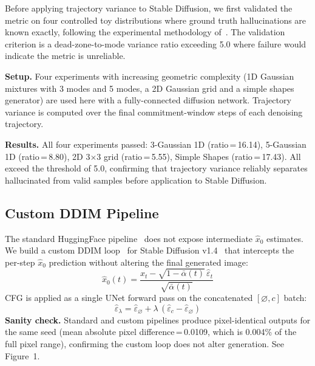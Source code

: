 \documentclass[conference]{IEEEtran}
\begin{document}
Before applying trajectory variance to Stable Diffusion, we first
validated the metric on four controlled toy distributions where
ground truth hallucinations are known exactly, following the
experimental methodology of~\cite{yi2024understanding}. The
validation criterion is a dead-zone-to-mode variance ratio exceeding
5.0 where failure would indicate the metric is unreliable.

\textbf{Setup.} Four experiments with increasing geometric complexity
(1D Gaussian mixtures with 3 modes and 5 modes, a 2D Gaussian grid and a simple shapes
generator) are used here with a fully-connected diffusion network. Trajectory variance
is computed over the final commitment-window steps of each denoising
trajectory.

\textbf{Results.} All four experiments passed: 3-Gaussian 1D
(ratio\,=\,16.14), 5-Gaussian 1D (ratio\,=\,8.80), 2D 3$\times$3
grid (ratio\,=\,5.55), Simple Shapes (ratio\,=\,17.43). All exceed
the threshold of 5.0, confirming that trajectory variance reliably
separates hallucinated from valid samples before application to
Stable Diffusion.

\subsection{Custom DDIM Pipeline}
\label{sec:pipeline}

The standard HuggingFace pipeline~\cite{wolf2020huggingface} does
not expose intermediate $\hat{x}_0$ estimates. We build a custom
DDIM loop~\cite{song2020ddim} for Stable Diffusion
v1.4~\cite{rombach2022ldm} that intercepts the per-step $\hat{x}_0$
prediction without altering the final generated image:
\begin{equation}
  \hat{x}_0(t) = \frac{x_t - \sqrt{1-\bar{\alpha}(t)}\,\hat{\varepsilon}_t}
                      {\sqrt{\bar{\alpha}(t)}}
  \label{eq:x0_pred}
\end{equation}
CFG is applied as a single UNet forward pass on the concatenated
$[\varnothing, c]$ batch:
\begin{equation}
  \hat{\varepsilon}_\lambda = \hat{\varepsilon}_\varnothing
    + \lambda\,(\hat{\varepsilon}_c - \hat{\varepsilon}_\varnothing)
  \label{eq:cfg}
\end{equation}
\textbf{Sanity check.} Standard and custom pipelines produce
pixel-identical outputs for the same seed (mean absolute pixel
difference\,=\,0.0109, which is 0.004\% of the full pixel range),
confirming the custom loop does not alter generation. See Figure~1.
\end{document}
